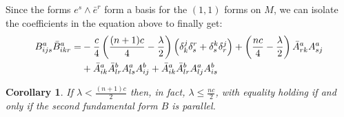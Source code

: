 \documentclass[11pt]{amsart}
\newtheorem{cor}[subsection]{Corollary}
\theoremstyle{definition}
\begin{document}
%
Since the forms $e^s \wedge \bar{e}^r$ form a basis for the $(1,1)$ forms on $M$, we can isolate the coefficients in the equation above to finally get:
%
\begin{align}
B^a_{ijs} \bar{B}^a_{ikr} =& - \frac{c}{4} \left( \frac{(n+1)c}{4} - \frac{\lambda}{2} \right) \left( \delta^j_k \delta^r_s + \delta^k_s \delta^j_r \right) + \left( \frac{nc}{4} - \frac{\lambda}{2} \right)  \bar{A}^a_{rk} A^a_{sj}\\
&+ \bar{A}^a_{ik} \bar{A}^b_{lr} A^a_{ls} A^b_{ij} + \bar{A}^a_{ik} \bar{A}^b_{lr} A^a_{lj} A^b_{is}  \notag 
\end{align}

\begin{cor}  If $\lambda < \frac{(n+1)c}{2}$ then, in fact, $\lambda \leq \frac{nc}{2}$, with equality holding if and only if the second fundamental form $B$ is parallel.
\end{cor}
%
\end{document}
